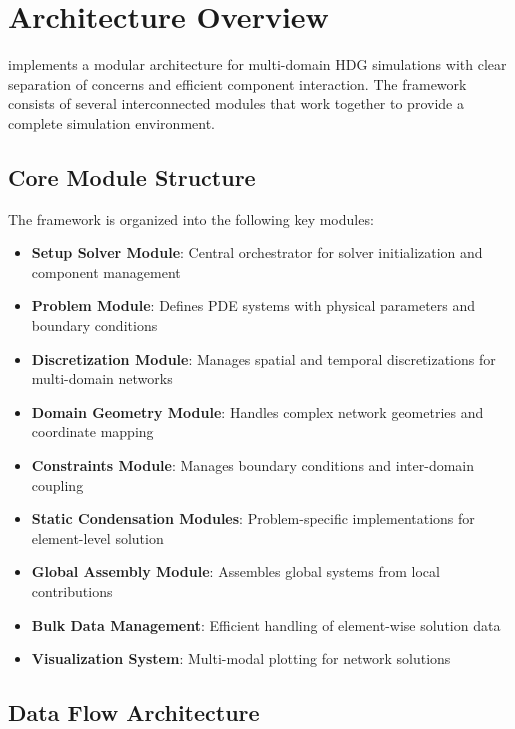 
\section{Architecture Overview}
\label{sec:architecture}

\bionetflux{} implements a modular architecture for multi-domain HDG simulations with clear separation of concerns and efficient component interaction. The framework consists of several interconnected modules that work together to provide a complete simulation environment.

\subsection{Core Module Structure}

The framework is organized into the following key modules:

\begin{itemize}
    \item \textbf{Setup Solver Module}: Central orchestrator for solver initialization and component management
    \item \textbf{Problem Module}: Defines PDE systems with physical parameters and boundary conditions
    \item \textbf{Discretization Module}: Manages spatial and temporal discretizations for multi-domain networks
    \item \textbf{Domain Geometry Module}: Handles complex network geometries and coordinate mapping
    \item \textbf{Constraints Module}: Manages boundary conditions and inter-domain coupling
    \item \textbf{Static Condensation Modules}: Problem-specific implementations for element-level solution
    \item \textbf{Global Assembly Module}: Assembles global systems from local contributions
    \item \textbf{Bulk Data Management}: Efficient handling of element-wise solution data
    \item \textbf{Visualization System}: Multi-modal plotting for network solutions
\end{itemize}

\subsection{Data Flow Architecture}

